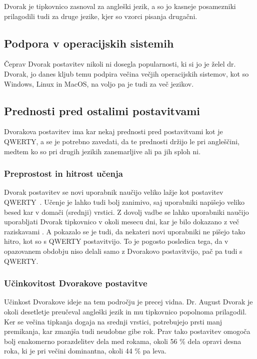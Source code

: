     Dvorak je tipkovnico zasnoval za angleški jezik, a so jo kasneje posamezniki prilagodili tudi za druge jezike,
    kjer so vzorci pisanja drugačni.

    \subsection{Podpora v operacijskih sistemih}\label{subsec:podpora-na-operacijskih-sistemih}

    Čeprav Dvorak postavitev nikoli ni dosegla popularnosti, ki si jo je želel dr. Dvorak,
    jo danes kljub temu podpira večina večjih operacijskih sistemov, kot so Windows, Linux in MacOS,
    na voljo pa je tudi za več jezikov.
    
    \subsection{Prednosti pred ostalimi postavitvami}\label{subsec:prednosti-pred-ostalimi-postavitvami}

    Dvorakova postavitev ima kar nekaj prednosti pred postavitvami kot je QWERTY\@,
    a se je potrebno zavedati, da te prednosti držijo le pri angleščini,
    medtem ko so pri drugih jezikih zanemarljive ali pa jih sploh ni.

    \subsubsection{Preprostost in hitrost učenja}

    Dvorak postavitev se novi uporabnik naučijo veliko lažje kot postavitev QWERTY\@~\cite{dvorak_procon}.
    Učenje je lahko tudi bolj zanimivo, saj uporabniki napišejo veliko besed kar v domači (srednji) vrstici.
    Z dovolj vadbe se lahko uporabniki naučijo uporabljati Dvorak tipkovnico v okoli mesecu dni,
    kar je bilo dokazano z več raziskavami \cite{mwbrooks_opinions}.
    A pokazalo se je tudi, da nekateri novi uporabniki ne pišejo tako hitro, kot so s QWERTY postavitvijo.
    To je pogosto posledica tega, da v opazovanem obdobju niso delali samo z Dvorakovo postavitvijo,
    pač pa tudi s QWERTY\@.

    \subsubsection{Učinkovitost Dvorakove postavitve}

    Učinkost Dvorakove ideje na tem področju je precej vidna.
    Dr. August Dvorak je okoli desetletje preučeval angleški jezik in mu tipkovnico popolnoma prilagodil.
    Ker se večina tipkanja dogaja na srednji vrstici, potrebujejo prsti manj premikanja, kar zmanjša tudi neudobne gibe rok.
    Prav tako postavitev omogoča bolj enakomerno porazdelitev dela med rokama, okoli 56 \% dela opravi desna roka,
    ki je pri večini dominantna, okoli 44 \% pa leva.

